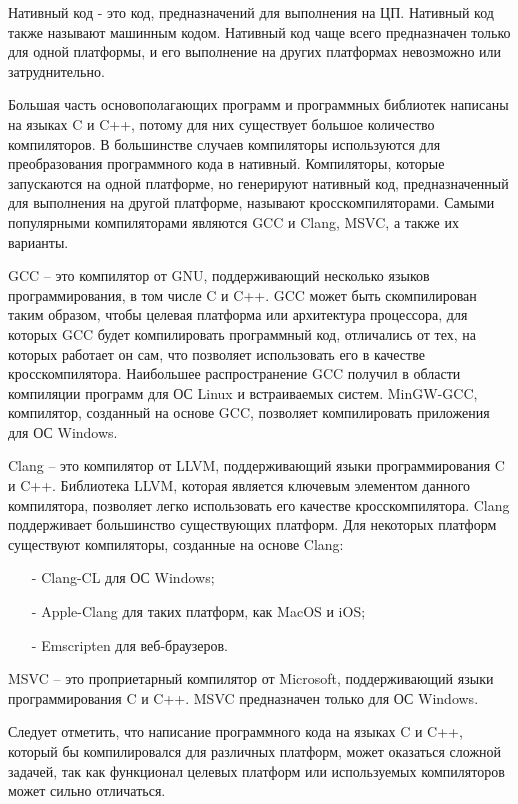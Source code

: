 Нативный код - это код, предназначений для выполнения на ЦП.
Нативный код также называют машинным кодом.
Нативный код чаще всего предназначен только для одной платформы, и его выполнение на других платформах невозможно или затруднительно.

Большая часть основополагающих программ и программных библиотек написаны на языках C и C++, потому для них существует большое количество компиляторов.
В большинстве случаев компиляторы используются для преобразования программного кода в нативный.
Компиляторы, которые запускаются на одной платформе, но генерируют нативный код, предназначенный для выполнения на другой платформе, называют кросскомпиляторами.
Самыми популярными компиляторами являются GCC и Clang, MSVC, а также их варианты.

GCC -- это компилятор от GNU, поддерживающий несколько языков программирования, в том числе C и C++. 
GCC может быть скомпилирован таким образом, чтобы целевая платформа или архитектура процессора, для которых GCC будет компилировать программный код, отличались от тех, на которых работает он сам, что позволяет использовать его в качестве кросскомпилятора.
Наибольшее распространение GCC получил в области компиляции программ для ОС Linux и встраиваемых систем.
MinGW-GCC, компилятор, созданный на основе GCC, позволяет компилировать приложения для ОС Windows.

Clang -- это компилятор от LLVM, поддерживающий языки программирования C и C++.
Библиотека LLVM, которая является ключевым элементом данного компилятора, позволяет легко использовать его качестве кросскомпилятора. 
Clang поддерживает большинство существующих платформ. 
Для некоторых платформ существуют компиляторы, созданные на основе Clang:
\begin{itemize}
    \item[-] Clang-CL для ОС Windows;
    \item[-] Apple-Clang для таких платформ, как MacOS и iOS;
    \item[-] Emscripten для веб-браузеров.
\end{itemize}

MSVC -- это проприетарный компилятор от Microsoft, поддерживающий языки программирования C и C++. 
MSVC предназначен только для ОС Windows. 

Следует отметить, что написание программного кода на языках C и C++, который бы компилировался для различных платформ, может оказаться сложной задачей, так как функционал целевых платформ или используемых компиляторов может сильно отличаться.




